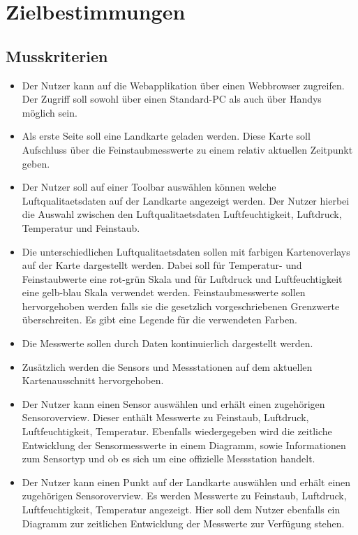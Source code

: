 \section{Zielbestimmungen}
\subsection{Musskriterien}
 \begin{itemize}
	\item Der Nutzer kann auf die Webapplikation über einen Webbrowser zugreifen. Der Zugriff soll sowohl über einen \gls{Standard-PC} als auch über Handys möglich sein.
	\item Als erste Seite soll eine Landkarte geladen werden. Diese Karte soll Aufschluss über die \gls{Feinstaub}messwerte zu einem relativ aktuellen Zeitpunkt geben.
	\item Der Nutzer soll auf einer \gls{Toolbar} auswählen können welche \gls{Luftqualitaetsdaten} auf der Landkarte angezeigt werden. Der Nutzer hierbei die Auswahl zwischen den \gls{Luftqualitaetsdaten} Luftfeuchtigkeit, Luftdruck, Temperatur und \gls{Feinstaub}.
	\item Die unterschiedlichen \gls{Luftqualitaetsdaten} sollen mit farbigen \glspl{Kartenoverlay} auf der Karte dargestellt werden. Dabei soll für Temperatur- und \gls{Feinstaub}werte eine rot-grün Skala und für Luftdruck und Luftfeuchtigkeit eine gelb-blau Skala verwendet werden. \gls{Feinstaub}messwerte sollen hervorgehoben werden falls sie die gesetzlich vorgeschriebenen Grenzwerte überschreiten. Es gibt eine Legende für die verwendeten Farben. 
	\item Die Messwerte sollen durch  Daten kontinuierlich dargestellt werden.
	\item Zusätzlich werden die \glspl{Sensor} und Messstationen auf dem aktuellen Kartenausschnitt hervorgehoben.
	\item Der Nutzer kann einen \gls{Sensor} auswählen und erhält einen zugehörigen \gls{Sensoroverview}. Dieser enthält Messwerte zu \gls{Feinstaub}, Luftdruck, Luftfeuchtigkeit, Temperatur. Ebenfalls wiedergegeben wird die zeitliche Entwicklung der \gls{Sensor}messwerte in einem Diagramm, sowie Informationen zum Sensortyp und ob es sich um eine offizielle Messstation handelt.
	\item Der Nutzer kann einen Punkt auf der Landkarte auswählen und erhält einen zugehörigen \gls{Sensoroverview}. Es werden  Messwerte zu \gls{Feinstaub}, Luftdruck, Luftfeuchtigkeit, Temperatur angezeigt. Hier soll dem Nutzer ebenfalls ein Diagramm zur zeitlichen Entwicklung der  Messwerte zur Verfügung stehen.

\end{itemize}
